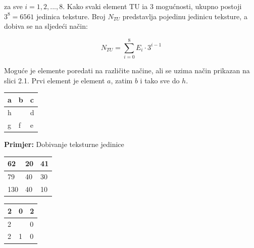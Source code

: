 \documentclass[times, utf8, zavrsni]{fer}
\begin{document}
za sve \(i=1,2,...,8\). Kako svaki element TU ia 3 mogućnosti, ukupno
postoji \(3^8 = 6561\) jedinica teksture. Broj \(N_{TU}\) predstavlja 
pojedinu jedinicu teksture, a dobiva se na sljedeći način:

\[
N_{TU} = \sum_{i=0}^{8} E_i \cdot 3^{i-1}
\]

\newpage

Moguće je elemente poredati na različite načine, ali se uzima 
način prikazan na slici 2.1. Prvi element je element \(a\), zatim \(b\) i 
tako sve do \(h\).  

\bigbreak

\begin{minipage}{\linewidth}
\centering
\begin{tabularx}{0.25\textwidth}{| X | X | X |}
\hline
a & b & c \\ 
\hline
h &  & d  \\ 
\hline
g & f & e  \\
\hline
\end{tabularx}
\end{minipage}

\vspace{0.7cm}

\textbf{Primjer:} Dobivanje teksturne jedinice

\begin{multicols}{2}

\begin{minipage}{\linewidth}
\centering
\begin{tabularx}{0.4\textwidth}{| X | X | X |}
\hline
62 & 20 & 41 \\ 
\hline
79 & 40 & 30 \\ 
\hline
130 & 40 & 10 \\
\hline
\end{tabularx}
\end{minipage}

\begin{minipage}{\linewidth}
\centering
\begin{tabularx}{0.4\textwidth}{| X | X | X |}
\hline
2 & 0 & 2 \\ 
\hline
2 &  & 0 \\ 
\hline
2 & 1 & 0 \\
\hline
\end{tabularx}
\end{minipage}

\end{multicols}
\end{document}

